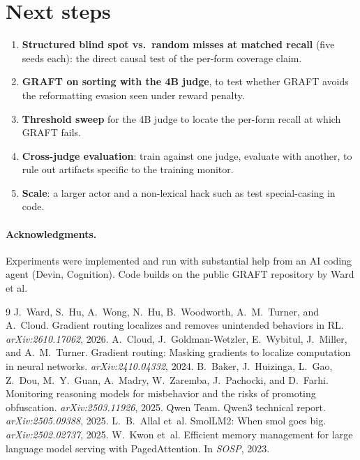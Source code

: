 \documentclass[11pt]{article}
\begin{document}
\section{Next steps}
\begin{enumerate}
\item \textbf{Structured blind spot vs.\ random misses at matched recall} (five seeds each): the direct causal test of the per-form coverage claim.
\item \textbf{GRAFT on sorting with the 4B judge}, to test whether GRAFT avoids the reformatting evasion seen under reward penalty.
\item \textbf{Threshold sweep} for the 4B judge to locate the per-form recall at which GRAFT fails.
\item \textbf{Cross-judge evaluation}: train against one judge, evaluate with another, to rule out artifacts specific to the training monitor.
\item \textbf{Scale}: a larger actor and a non-lexical hack such as test special-casing in code.
\end{enumerate}

\paragraph{Acknowledgments.} Experiments were implemented and run with substantial help from an AI coding agent (Devin, Cognition). Code builds on the public GRAFT repository by Ward et al.

\begin{thebibliography}{9}
 J.~Ward, S.~Hu, A.~Wong, N.~Hu, B.~Woodworth, A.~M.~Turner, and A.~Cloud. Gradient routing localizes and removes unintended behaviors in RL. \emph{arXiv:2610.17062}, 2026.
 A.~Cloud, J.~Goldman-Wetzler, E.~Wybitul, J.~Miller, and A.~M.~Turner. Gradient routing: Masking gradients to localize computation in neural networks. \emph{arXiv:2410.04332}, 2024.
 B.~Baker, J.~Huizinga, L.~Gao, Z.~Dou, M.~Y.~Guan, A.~Madry, W.~Zaremba, J.~Pachocki, and D.~Farhi. Monitoring reasoning models for misbehavior and the risks of promoting obfuscation. \emph{arXiv:2503.11926}, 2025.
 Qwen Team. Qwen3 technical report. \emph{arXiv:2505.09388}, 2025.
 L.~B.~Allal et~al. SmolLM2: When smol goes big. \emph{arXiv:2502.02737}, 2025.
 W.~Kwon et~al. Efficient memory management for large language model serving with PagedAttention. In \emph{SOSP}, 2023.
\end{thebibliography}
\end{document}
